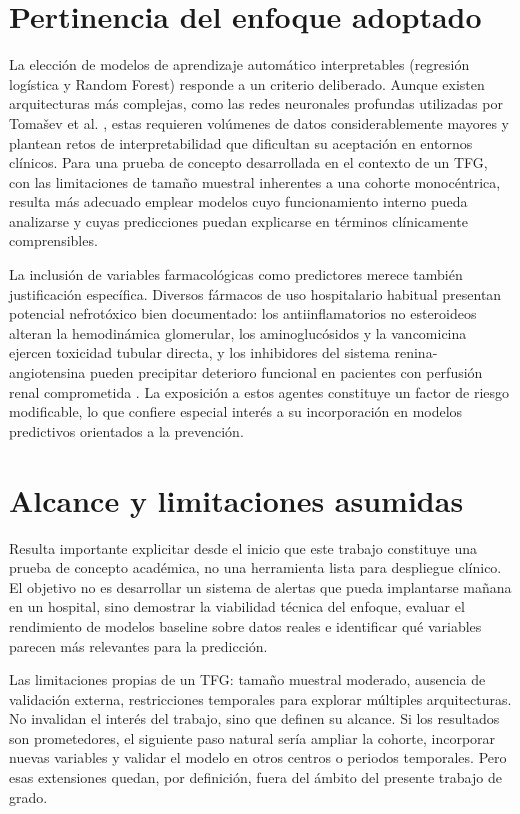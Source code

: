 \documentclass[12pt, a4paper, oneside]{report}
\begin{document}
\section{Pertinencia del enfoque adoptado}
\label{sec:enfoque}
La elección de modelos de aprendizaje automático interpretables (regresión logística y Random Forest) responde a un criterio deliberado. Aunque existen arquitecturas más complejas, como las redes neuronales profundas utilizadas por Tomašev et al. \parencite{tomasev2019nature}, estas requieren volúmenes de datos considerablemente mayores y plantean retos de interpretabilidad que dificultan su aceptación en entornos clínicos. Para una prueba de concepto desarrollada en el contexto de un TFG, con las limitaciones de tamaño muestral inherentes a una cohorte monocéntrica, resulta más adecuado emplear modelos cuyo funcionamiento interno pueda analizarse y cuyas predicciones puedan explicarse en términos clínicamente comprensibles.

La inclusión de variables farmacológicas como predictores merece también justificación específica. Diversos fármacos de uso hospitalario habitual presentan potencial nefrotóxico bien documentado: los antiinflamatorios no esteroideos alteran la hemodinámica glomerular, los aminoglucósidos y la vancomicina ejercen toxicidad tubular directa, y los inhibidores del sistema renina-angiotensina pueden precipitar deterioro funcional en pacientes con perfusión renal comprometida \parencite{perazella2019drug, perazella2022drugaki}. La exposición a estos agentes constituye un factor de riesgo modificable, lo que confiere especial interés a su incorporación en modelos predictivos orientados a la prevención.

\section{Alcance y limitaciones asumidas}
\label{sec:alcance}
Resulta importante explicitar desde el inicio que este trabajo constituye una prueba de concepto académica, no una herramienta lista para despliegue clínico. El objetivo no es desarrollar un sistema de alertas que pueda implantarse mañana en un hospital, sino demostrar la viabilidad técnica del enfoque, evaluar el rendimiento de modelos baseline sobre datos reales e identificar qué variables parecen más relevantes para la predicción.

Las limitaciones propias de un TFG: tamaño muestral moderado, ausencia de validación externa, restricciones temporales para explorar múltiples arquitecturas. No invalidan el interés del trabajo, sino que definen su alcance. Si los resultados son prometedores, el siguiente paso natural sería ampliar la cohorte, incorporar nuevas variables y validar el modelo en otros centros o periodos temporales. Pero esas extensiones quedan, por definición, fuera del ámbito del presente trabajo de grado.
\end{document}
